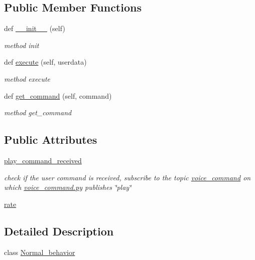 \subsection*{Public Member Functions}
\begin{DoxyCompactItemize}
\item 
def \hyperlink{classbehavior__manager_1_1Normal__behavior_a7ab22900e936fc3921a269389b51e6ab}{\+\_\+\+\_\+init\+\_\+\+\_\+} (self)
\begin{DoxyCompactList}\small\item\em method init \end{DoxyCompactList}\item 
def \hyperlink{classbehavior__manager_1_1Normal__behavior_a15faab6a43a39510355baad4faaa808a}{execute} (self, userdata)
\begin{DoxyCompactList}\small\item\em method execute \end{DoxyCompactList}\item 
def \hyperlink{classbehavior__manager_1_1Normal__behavior_aaaac0d8e5b98600a4e8461f706cb7ef0}{get\+\_\+command} (self, command)
\begin{DoxyCompactList}\small\item\em method get\+\_\+command \end{DoxyCompactList}\end{DoxyCompactItemize}
\subsection*{Public Attributes}
\begin{DoxyCompactItemize}
\item 
\hyperlink{classbehavior__manager_1_1Normal__behavior_a023e0b91a5c02b8bce8cc771bba4ecfc}{play\+\_\+command\+\_\+received}
\begin{DoxyCompactList}\small\item\em check if the user command is received, subscribe to the topic \hyperlink{namespacevoice__command}{voice\+\_\+command} on which \hyperlink{voice__command_8py}{voice\+\_\+command.\+py} publishes \char`\"{}play\char`\"{} \end{DoxyCompactList}\item 
\hyperlink{classbehavior__manager_1_1Normal__behavior_a8c0881c34370caec4f5298f0ebe35489}{rate}
\end{DoxyCompactItemize}


\subsection{Detailed Description}
class \hyperlink{classbehavior__manager_1_1Normal__behavior}{Normal\+\_\+behavior} 


